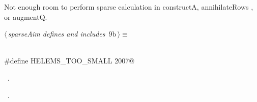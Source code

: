 \documentclass{article}
\begin{document}
\begin{description}
\begin{description}
\begin{flushleft}
\begin{minipage}{\linewidth}
\begin{list}{}{\setlength{\itemsep}{-\parsep}\setlength{\itemindent}{-\leftmargin}}
\item{}
\end{list}
\end{minipage}\vspace{4ex}
\end{flushleft}
\item[{\bf HELEMS\_TOO\_SMALL}] Not enough room to perform sparse calculation
in constructA, annihilateRows , or augmentQ.
\begin{flushleft} \small
\begin{minipage}{\linewidth}\label{scrap10}\raggedright\small
{} $\langle\,${\itshape sparseAim defines and includes}\nobreak\ {\footnotesize {9b}}$\,\rangle\equiv$
\vspace{-1ex}
\begin{list}{}{} \item
\mbox{}\verb@@\\
\mbox{}\verb@#define HELEMS_TOO_SMALL 2007@\\
\mbox{}\verb@@{\NWsep}
\end{list}
\vspace{-1.5ex}
\footnotesize
\begin{list}{}{\setlength{\itemsep}{-\parsep}\setlength{\itemindent}{-\leftmargin}}
\item \NWtxtMacroDefBy\ .
\item \NWtxtMacroRefIn\ .


\end{list}
\end{minipage}
\end{flushleft}
\end{description}
\end{description}
\end{document}
